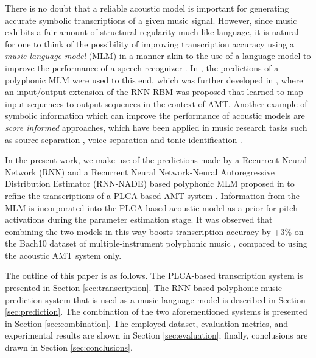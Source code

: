 There is no doubt that a reliable acoustic model is important for generating accurate symbolic transcriptions of a given music signal. However, since music exhibits a fair amount of structural regularity much like language, it is natural for one to think of the possibility of improving transcription accuracy using a \textit{music language model} (MLM) in a manner akin to the use of a language model to improve the performance of a speech recognizer \cite{Rabiner1993}. In \cite{Boulanger-Lewandowski2012}, the predictions of a polyphonic MLM were used to this end, which was further developed in \cite{Boulanger-Lewandowski2013}, where an input/output extension of the RNN-RBM was proposed that learned to map input sequences to output sequences in the context of AMT. Another example of symbolic information which can improve the performance of acoustic models are \textit{score informed} approaches, which have been applied in music research tasks such as source separation \cite{Ewert2012}, voice separation \cite{
Ewert2011} and tonic identification \cite{Senturk2013}. %

In the present work, we make use of the predictions made by a Recurrent Neural Network (RNN) and a Recurrent Neural Network-Neural Autoregressive Distribution Estimator (RNN-NADE) based polyphonic MLM proposed in \cite{Boulanger-Lewandowski2012} to refine the transcriptions of a PLCA-based AMT system \cite{Benetos2012, Benetos2013}. Information from the MLM is incorporated into the PLCA-based acoustic model as a prior for pitch activations during the parameter estimation stage. It was observed that combining the two models in this way boosts transcription accuracy by +3\% on the Bach10 dataset of multiple-instrument polyphonic music \cite{Duan2010}, compared to using the acoustic AMT system only.

The outline of this paper is as follows. The PLCA-based transcription system is presented in Section \ref{sec:transcription}. The RNN-based polyphonic music prediction system that is used as a music language model is described in Section \ref{sec:prediction}. The combination of the two aforementioned systems is presented in Section \ref{sec:combination}. The employed dataset, evaluation metrics, and experimental results are shown in Section \ref{sec:evaluation}; finally, conclusions are drawn in Section \ref{sec:conclusions}.